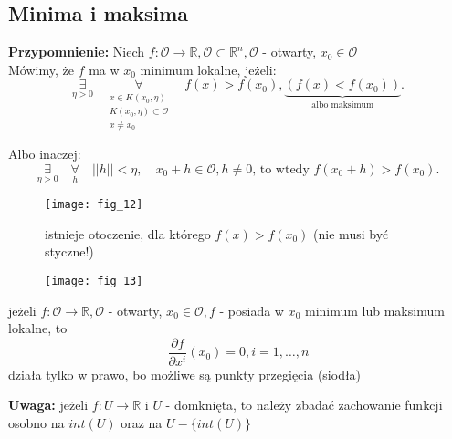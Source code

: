 \documentclass[../main.tex]{subfiles}
\begin{document}
\pagebreak
\subsection{Minima i maksima}
\textbf{Przypomnienie:}
Niech $f: \mathcal{O}\to \mathbb{R}, \mathcal{O}\subset \mathbb{R}^n, \mathcal{O}$ - otwarty, $x_0 \in \mathcal{O}$\\
Mówimy, że $f$ ma w $x_0$ minimum lokalne, jeżeli:
\[
    \underset{\eta > 0}{\exists} \quad
\underset{\substack{
x\in K(x_0,\eta)\\
K(x_0,\eta) \subset \mathcal{O}\\
x \neq x_0
}}{\forall} \quad f(x) > f(x_0), \underbrace{\left(f(x) < f(x_0)\right)}_{\text{albo maksimum}}.
\]

Albo inaczej:
\[
    \underset{\eta > 0}{\exists} \quad\underset{h}{\forall}\quad ||h|| < \eta, \quad x_0+h \in \mathcal{O}, h \neq 0\text{, to wtedy } f(x_0+h)>f(x_0).
\]

\begin{figure}[h]
    \centering
    \texttt{[image: fig\_12]}
    \caption{istnieje otoczenie, dla którego  $f(x)>f(x_0)$ (nie musi być styczne!)}
\end{figure}

\begin{figure}[h]
    \centering
    \texttt{[image: fig\_13]}
    \caption{}
    \label{fig:}
\end{figure}

\begin{stw}
jeżeli $f: \mathcal{O} \rightarrow \mathbb{R}, \mathcal{O}$ - otwarty, $x_0 \in \mathcal{O}, f$ - posiada w $x_0$ minimum lub maksimum lokalne, to $$\frac{\partial f}{\partial x^i} (x_0) = 0, i = 1,\dots,n$$
działa tylko w prawo, bo możliwe są punkty przegięcia (siodła)
\end{stw}

\textbf{Uwaga:} jeżeli $f: U\to \mathbb{R}$ i $U$ - domknięta, to należy zbadać zachowanie funkcji osobno na $int(U)$ oraz na $U - \{int(U)\}$
\end{document}
